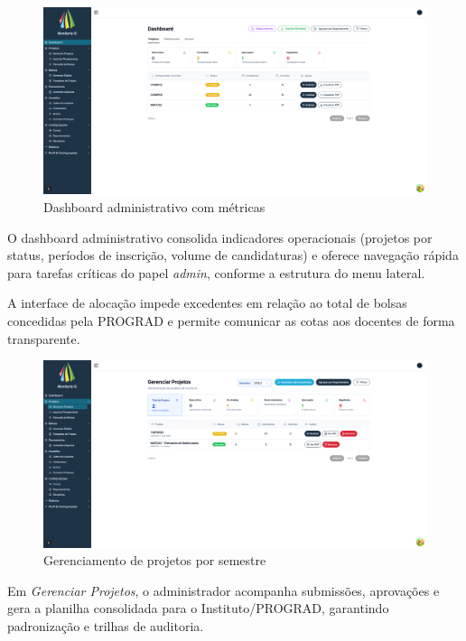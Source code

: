 \documentclass[portuguese]{sbc2025}%
\begin{document}
\begin{figure}[h!]
  \centering
  \includegraphics[width=\linewidth]{images/monitoria/admin-dashboard.png}
  \caption{Dashboard administrativo com métricas}
  \label{fig:dashboard}
\end{figure}

O dashboard administrativo consolida indicadores operacionais (projetos por status, períodos de inscrição, volume de candidaturas) e oferece navegação rápida para tarefas críticas do papel \textit{admin}, conforme a estrutura do menu lateral.

A interface de alocação impede excedentes em relação ao total de bolsas concedidas pela PROGRAD e permite comunicar as cotas aos docentes de forma transparente.

\begin{figure}[h!]
  \centering
  \includegraphics[width=\linewidth]{images/monitoria/admin-manage-projects.png}
  \caption{Gerenciamento de projetos por semestre}
  \label{fig:projetos}
\end{figure}

Em \textit{Gerenciar Projetos}, o administrador acompanha submissões, aprovações e gera a planilha consolidada para o Instituto/PROGRAD, garantindo padronização e trilhas de auditoria.
\end{document}
